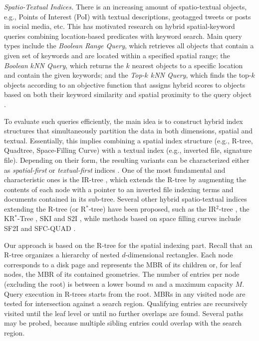 \vspace{2mm}

\noindent \emph{Spatio-Textual Indices.} There is an increasing amount of spatio-textual objects, e.g., Points of Interest (PoI) with textual descriptions, geotagged tweets or posts in social media, etc. This has motivated research on hybrid spatial-keyword queries combining location-based predicates with keyword search. Main query types include the \emph{Boolean Range Query}, which retrieves all objects that contain a given set of keywords and are located within a specified spatial range; the \emph{Boolean $k$NN Query}, which returns the $k$ nearest objects to a specific location and contain the given keywords; and the \emph{Top-$k$ $k$NN Query}, which finds the top-$k$ objects according to an objective function that assigns hybrid scores to objects based on both their keyword similarity and spatial proximity to the query object \cite{chen2013pvldb}.

To evaluate such queries efficiently, the main idea is to construct hybrid index structures that simultaneously partition the data in both dimensions, spatial and textual. Essentially, this implies combining a spatial index structure (e.g., R-tree, Quadtree, Space-Filling Curve) with a textual index (e.g., inverted file, signature file). Depending on their form, the resulting variants can be characterized either as {\em spatial-first} or {\em textual-first} indices \cite{christoforaki2011cikm}. One of the most fundamental and characteristic ones is the IR-tree \cite{cong2009vldb,zhisheng2011tkde}, which extends the R-tree by augmenting the contents of each node with a pointer to an inverted file indexing terms and documents contained in its sub-tree. Several other hybrid spatio-textual indices extending the R-tree (or R$^*$-tree) have been proposed, such as the IR$^2$-tree \cite{defelipe2008icde}, the KR$^*$-Tree \cite{hariharan2007ssdbm}, SKI \cite{cary2010ssdbm} and S2I \cite{rocha2011ssd}, while methods based on space filling curves include SF2I \cite{chen2006sigmod} and SFC-QUAD \cite{christoforaki2011cikm}.

Our approach is based on the R-tree \cite{Guttman1984} for the spatial indexing part. Recall that an R-tree organizes a hierarchy of nested $d$-dimensional rectangles. Each node corresponds to a disk page and represents the MBR of its children or, for leaf nodes, the MBR of its contained geometries. The number of entries per node (excluding the root) is between a lower bound $m$ and a maximum capacity $M$. Query execution in R-trees starts from the root. MBRs in any visited node are tested for intersection against a search region. Qualifying entries are recursively visited until the leaf level or until no further overlaps are found. Several paths may be probed, because multiple sibling entries could overlap with the search region.

